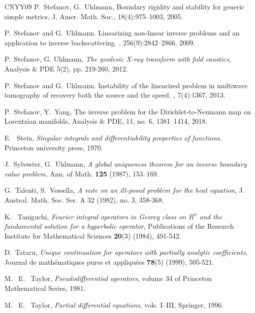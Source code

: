 \documentclass[12pt,twoside]{amsart}
\numberwithin{equation}{section}
\begin{document}
\begin{thebibliography}{CNYY09}
P.\ Stefanov, G.\ Uhlmann, Boundary rigidity and stability for generic simple metrics, J. Amer. Math. Soc., 18(4):975--1003, 2005.


P.\ Stefanov and G.\ Uhlmann.
\newblock Linearizing non-linear inverse problems and an application to inverse backscattering.
, 256(9):2842--2866, 2009.

P.\ Stefanov, G. Uhlmann, \textit{{The geodesic X-ray transform with fold caustics}}, Analysis \& PDE 5(2), pp. 219-260, 2012.

P.\ Stefanov and G.\ Uhlmann.
\newblock Instability of the linearized problem in multiwave tomography of recovery both the source and the speed.
, 7(4):1367, 2013.

P.\ Stefanov, Y.\ Yang, The inverse problem for the Dirichlet-to-Neumann map on Lorentzian manifolds, Analysis \& PDE, 11, no. 6, 1381--1414, 2018.


E. \ Stein, \textit{{Singular integrals and differentiability properties of functions.}} Princeton university press, 1970.



J.\ Sylvester, G.\ Uhlmann,
\textit{{A global uniqueness theorem for an inverse boundary value problem}}, Ann. of Math. {\bf 125} (1987), 153--169.

G.\ Talenti, S.\ Vessella, 
\textit{{A note on an ill-posed problem for the heat equation}}, J. Austral. Math. Soc. Ser. A 32 (1982), no. 3, 358-368.

K. \ Taniguchi, 
\textit{{Fourier integral operators in Gevrey class on {$R^n$} and the fundamental solution for a hyperbolic operator}}, Publications of the Research Institute for Mathematical Sciences {\bf 20}(3) (1984), 491-542.

D.\ Tataru,
\textit{{Unique continuation for operators with partially analytic coefficients}}, Journal de math{\'e}matiques pures et appliqu{\'e}es {\bf 78}(5) (1999), 505-521.


M. \ E. \ Taylor, \textit{{Pseudodifferential operators}}, volume 34 of Princeton Mathematical Series, 1981.

M. \ E. \ Taylor, \textit{{Partial differential equations}}, vols. I--III, Springer, 1996.



\end{thebibliography}
\end{document}
